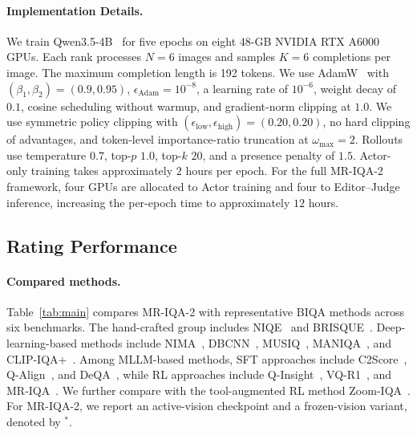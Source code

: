 \documentclass[letterpaper]{article} %
\begin{document}
\paragraph{Implementation Details.}
We train Qwen3.5-4B~\citep{qwen35} for five epochs on eight 48-GB NVIDIA RTX
A6000 GPUs. Each rank processes $N=6$ images and samples $K=6$ completions per
image. The maximum completion length is 192 tokens. We use
AdamW~\citep{adam} with
$(\beta_1,\beta_2)=(0.9,0.95)$,
$\epsilon_{\mathrm{Adam}}=10^{-8}$, a learning rate of $10^{-6}$, weight decay
of $0.1$, cosine scheduling without warmup, and gradient-norm clipping at
$1.0$. We use symmetric policy clipping with
$(\epsilon_{\mathrm{low}},\epsilon_{\mathrm{high}})=(0.20,0.20)$, no hard
clipping of advantages, and token-level importance-ratio truncation at
$\omega_{\max}=2$. Rollouts use
temperature $0.7$, top-$p$ $1.0$, top-$k$ $20$, and a presence penalty of
$1.5$. Actor-only training takes approximately $2$ hours per epoch. For the
full MR-IQA-2 framework, four GPUs are allocated to Actor training and four to
Editor--Judge inference, increasing the per-epoch time to approximately $12$
hours.

\subsection{Rating Performance}
\label{sec:rating-performance}

\paragraph{Compared methods.}
Table~\ref{tab:main} compares MR-IQA-2 with representative BIQA methods across
six benchmarks. The hand-crafted group includes NIQE~\citep{NIQE} and
BRISQUE~\citep{BRISQUE}. Deep-learning-based methods include
NIMA~\citep{nima}, DBCNN~\citep{dbcnn}, MUSIQ~\citep{musiq},
MANIQA~\citep{yang2022maniqa}, and CLIP-IQA+~\citep{wang2023exploring}.
Among MLLM-based methods, SFT approaches include
C2Score~\citep{zhu2024adaptive}, Q-Align~\citep{q-align}, and
DeQA~\citep{deqa}, while RL approaches include Q-Insight~\citep{q-insight},
VQ-R1~\citep{Visualquality-r1}, and MR-IQA~\citep{mr-iqa}. We further compare
with the tool-augmented RL method Zoom-IQA~\citep{zoom-iqa}. For MR-IQA-2, we
report an active-vision checkpoint and a frozen-vision variant, denoted by
$^{*}$.
\end{document}

